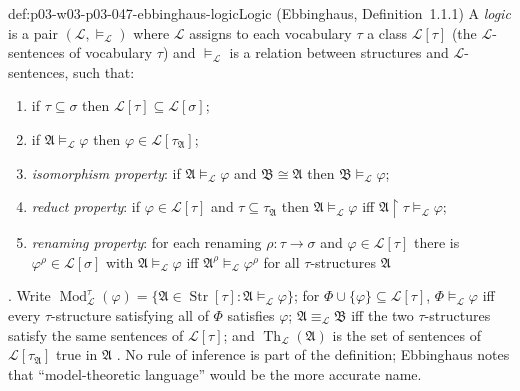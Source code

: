 \begin{hbdefinition}{def:p03-w03-p03-047-ebbinghaus-logic}{Logic (Ebbinghaus, Definition~1.1.1)}
A \emph{logic} is a pair \((\mathscr L,\models_{\mathscr L})\) where
\(\mathscr L\) assigns to each vocabulary \(\tau\) a class
\(\mathscr L[\tau]\) (the \(\mathscr L\)-sentences of vocabulary \(\tau\))
and \(\models_{\mathscr L}\) is a relation between structures and
\(\mathscr L\)-sentences, such that:
\begin{enumerate}
 \item[(i)] if \(\tau\subseteq\sigma\) then
       \(\mathscr L[\tau]\subseteq\mathscr L[\sigma]\);
 \item[(ii)] if \(\mathfrak A\models_{\mathscr L}\varphi\) then
       \(\varphi\in\mathscr L[\tau_{\mathfrak A}]\);
 \item[(iii)] \emph{isomorphism property}: if
       \(\mathfrak A\models_{\mathscr L}\varphi\) and
       \(\mathfrak B\cong\mathfrak A\) then
       \(\mathfrak B\models_{\mathscr L}\varphi\);
 \item[(iv)] \emph{reduct property}: if \(\varphi\in\mathscr L[\tau]\) and
       \(\tau\subseteq\tau_{\mathfrak A}\) then
       \(\mathfrak A\models_{\mathscr L}\varphi\) iff
       \(\mathfrak A\restriction\tau\models_{\mathscr L}\varphi\);
 \item[(v)] \emph{renaming property}: for each renaming
       \(\rho:\tau\to\sigma\) and \(\varphi\in\mathscr L[\tau]\) there is
       \(\varphi^\rho\in\mathscr L[\sigma]\) with
       \(\mathfrak A\models_{\mathscr L}\varphi\) iff
       \(\mathfrak A^\rho\models_{\mathscr L}\varphi^\rho\) for all
       \(\tau\)-structures \(\mathfrak A\)
\end{enumerate}
\cite[Ch.~II, Definition~1.1.1, pp.~27--28]{Ebbinghaus1985ExtendedLogics}.
Write \(\operatorname{Mod}^\tau_{\mathscr L}(\varphi)=\{\mathfrak A\in
\operatorname{Str}[\tau]:\mathfrak A\models_{\mathscr L}\varphi\}\); for
\(\Phi\cup\{\varphi\}\subseteq\mathscr L[\tau]\),
\(\Phi\models_{\mathscr L}\varphi\) iff every \(\tau\)-structure satisfying
all of \(\Phi\) satisfies \(\varphi\); \(\mathfrak A\equiv_{\mathscr L}\mathfrak B\)
iff the two \(\tau\)-structures satisfy the same sentences of
\(\mathscr L[\tau]\); and \(\operatorname{Th}_{\mathscr L}(\mathfrak A)\) is
the set of sentences of \(\mathscr L[\tau_{\mathfrak A}]\) true in
\(\mathfrak A\) \cite[Ch.~II, \S1.1, p.~28]{Ebbinghaus1985ExtendedLogics}.
No rule of inference is part of the definition; Ebbinghaus notes that
``model-theoretic language'' would be the more accurate name.
\end{hbdefinition}

